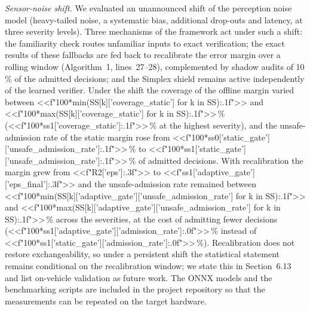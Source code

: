 \documentclass[11pt]{article}
\begin{document}
\emph{Sensor-noise shift.} We evaluated an unannounced shift of the perception noise model (heavy-tailed noise, a systematic
bias, additional drop-outs and latency, at three severity levels). Three mechanisms of the framework act under such a shift:
the familiarity check routes unfamiliar inputs to exact verification; the exact results of these fallbacks are fed back to
recalibrate the error margin over a rolling window (Algorithm~1, lines~27--28), complemented by shadow audits of 10\,\% of the
admitted decisions; and the Simplex shield remains active independently of the learned verifier. Under the shift the
coverage of the offline margin varied between <<f"{100*min(SS[k]['coverage_static'] for k in SS):.1f}">> and <<f"{100*max(SS[k]['coverage_static'] for k in SS):.1f}">>\,\%
(<<f"{100*ss1['coverage_static']:.1f}">>\,\% at the highest severity), and the unsafe-admission rate of the static margin rose from <<f"{100*ss0['static_gate']['unsafe_admission_rate']:.1f}">>\,\% to
<<f"{100*ss1['static_gate']['unsafe_admission_rate']:.1f}">>\,\% of admitted decisions. With recalibration the margin grew from
<<f"{R2['eps']:.3f}">> to <<f"{ss1['adaptive_gate']['eps_final']:.3f}">> and the unsafe-admission rate remained between
<<f"{100*min(SS[k]['adaptive_gate']['unsafe_admission_rate'] for k in SS):.1f}">> and <<f"{100*max(SS[k]['adaptive_gate']['unsafe_admission_rate'] for k in SS):.1f}">>\,\% across the severities, at the cost of admitting fewer decisions
(<<f"{100*ss1['adaptive_gate']['admission_rate']:.0f}">>\,\% instead of <<f"{100*ss1['static_gate']['admission_rate']:.0f}">>\,\%).
Recalibration does not restore exchangeability, so under a persistent shift the statistical statement remains conditional on the
recalibration window; we state this in Section~6.13 and list on-vehicle validation as future work. The ONNX models and the
benchmarking scripts are included in the project repository so that the measurements can be repeated on the target hardware.
\end{document}
